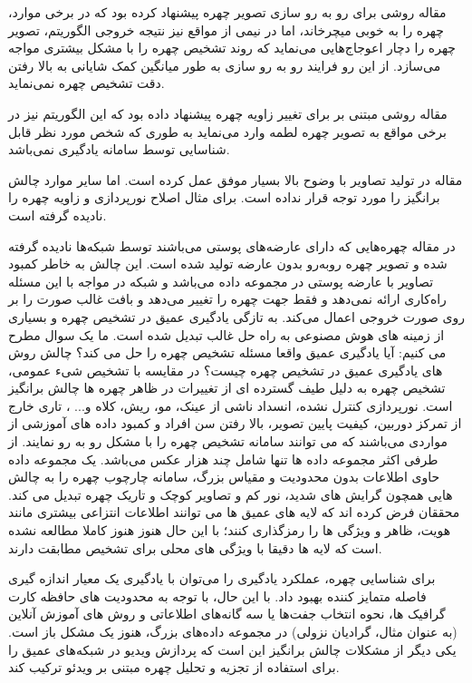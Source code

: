 \noindent
مقاله \cite{HAGHIGHAT201623} روشی برای رو به رو سازی تصویر چهره پیشنهاد کرده بود که در برخی موارد، چهره را به خوبی میچرخاند، اما در نیمی از مواقع نیز نتیجه خروجی الگوریتم، تصویر چهره را دچار اعوجاج‌هایی می‌نماید که روند تشخیص چهره را با مشکل بیشتری مواجه می‌سازد. از این رو فرایند رو به رو سازی به طور میانگین کمک شایانی به بالا رفتن دقت تشخیص چهره نمی‌نماید.

\noindent
مقاله \cite{radford2016unsupervised} روشی مبتنی بر  برای تغییر زاویه چهره پیشنهاد داده بود که این الگوریتم نیز در برخی مواقع به تصویر چهره لطمه وارد می‌نماید به طوری که شخص مورد نظر قابل شناسایی توسط سامانه یادگیری نمی‌باشد.

\noindent
مقاله  \cite{BANERJEE2018246} در تولید تصاویر با وضوح بالا بسیار موفق عمل کرده است. اما سایر موارد چالش برانگیز را مورد توجه قرار نداده است. برای مثال اصلاح نورپردازی و زاویه چهره را نادیده گرفته است.

\noindent
در مقاله \cite{8603840} چهره‌هایی که دارای عارضه‌های پوستی می‌باشند توسط شبکه‌ها نادیده گرفته شده و تصویر چهره روبه‌رو بدون عارضه تولید شده است. این چالش به خاطر کمبود تصاویر با عارضه پوستی در مجموعه داده می‌باشد و شبکه در مواجه با این مسئله راه‌کاری ارائه نمی‌دهد و فقط جهت چهره را تغییر می‌دهد و بافت غالب صورت را بر روی صورت خروجی اعمال می‌کند.
\noindent
به تازگی یادگیری عمیق در تشخیص چهره و بسیاری از زمینه های هوش مصنوعی به راه حل غالب تبدیل شده است. ما یک سوال مطرح می کنیم: آیا یادگیری عمیق واقعا مسئله تشخیص چهره را حل می کند؟ چالش روش های یادگیری عمیق در تشخیص چهره چیست؟ 
\noindent
در مقایسه با تشخیص شیء عمومی، تشخیص چهره به دلیل طیف گسترده ای از تغییرات در ظاهر چهره ها چالش برانگیز است. نورپردازی کنترل نشده، انسداد ناشی از عینک، مو، ریش، کلاه و... ، تاری خارج از تمرکز دوربین، کیفیت پایین تصویر، بالا رفتن سن افراد و کمبود داده های آموزشی از مواردی می‌باشند که می توانند سامانه تشخیص چهره را با مشکل رو به رو نمایند. از طرفی اکثر مجموعه داده ها تنها شامل چند هزار عکس می‌باشد. یک مجموعه داده حاوی اطلاعات بدون محدودیت و مقیاس بزرگ، سامانه چارچوب چهره را به چالش هایی همچون گرایش های شدید، نور کم و تصاویر کوچک و تاریک چهره تبدیل می کند. محققان فرض کرده اند که لایه های عمیق  ها می توانند اطلاعات انتزاعی بیشتری مانند هویت، ظاهر و ویژگی ها را رمزگذاری کنند؛ با این حال هنوز هنوز کاملا مطالعه نشده است که لایه ها دقیقا با ویژگی های محلی برای تشخیص مطابقت دارند.

\noindent
برای شناسایی چهره، عملکرد یادگیری را می‌توان با یادگیری یک معیار اندازه گیری فاصله متمایز کننده بهبود داد. با این حال، با توجه به محدودیت های حافظه کارت گرافیک ها، نحوه انتخاب جفت‌ها یا سه گانه‌های اطلاعاتی و روش های آموزش آنلاین (به عنوان مثال، گرادیان نزولی) در مجموعه داده‌های بزرگ، هنوز یک مشکل باز است. یکی دیگر از مشکلات چالش برانگیز این است که پردازش ویدیو در شبکه‌های عمیق را برای استفاده از تجزیه و تحلیل چهره مبتنی بر ویدئو ترکیب کند.
